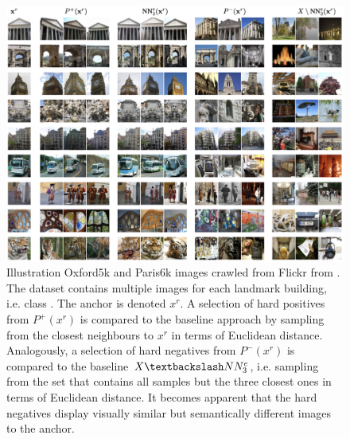 \begin{figure}[!htb] %
    \centering
    \includegraphics[width=360pt]{images/mining_manifold_examples.png}
    \caption{Illustration Oxford5k and Paris6k images crawled from Flickr from \citet{mining_manifolds_2018}.
    The dataset contains multiple images for each landmark building, i.e. class \citet{manifold_dataset}.
    The anchor is denoted $x^r$.
    A selection of hard positives from $P^+(x^r)$ is compared to the 
    baseline approach by sampling from the closest neighbours to $x^r$ in 
    terms of Euclidean distance.
    Analogously, a selection of hard negatives from $P^-(x^r)$ 
    is compared to the baseline $X \textbackslash NN^e_3$, 
    i.e. sampling from the set that contains all samples but the three closest ones in 
    terms of Euclidean distance.
    It becomes apparent that the hard negatives display visually similar but 
    semantically different images to the anchor. %
    }
    \label{fig:manifold_mining_examples}
\end{figure}
